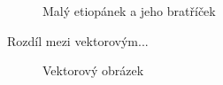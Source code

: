\documentclass[11pt,a4paper]{article}
\begin{document}
\begin{figure}[ht]
\begin{center}
{     }
    \caption{Malý etiopánek a jeho bratříček}
  \end{center}
\end{figure}

 \newpage
Rozdíl mezi vektorovým...

\begin{figure}[ht]
  \begin{center}
    \caption{Vektorový obrázek}
  \end{center}
\end{figure}
\end{document}
